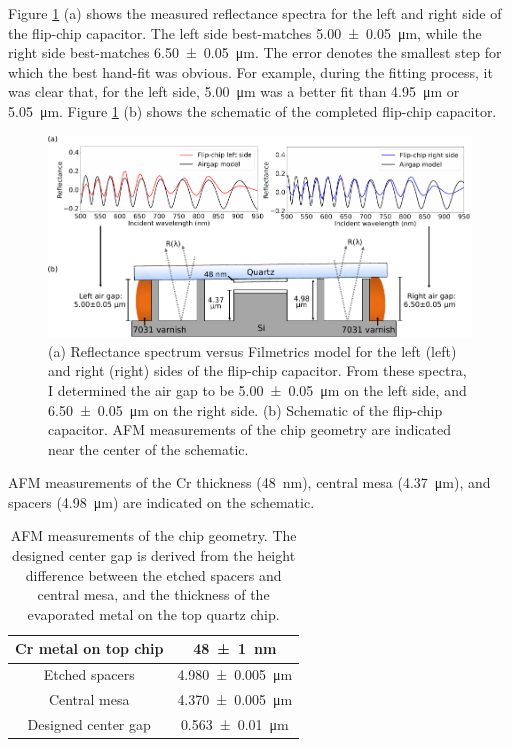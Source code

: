 \documentclass{beavtex_dub_edit}
\begin{document}
Figure \ref{FCCap Ref Summ} (a) shows the measured reflectance spectra for the left and right side of the flip-chip capacitor. The left side best-matches \SI{5.00(5)}{\micro\meter}, while the right side best-matches \SI{6.50(5)}{\micro\meter}. The error denotes the smallest step for which the best hand-fit was obvious. For example, during the fitting process, it was clear that, for the left side, \SI{5.00}{\micro\meter} was a better fit than \SI{4.95}{\micro\meter} or \SI{5.05}{\micro\meter}. Figure \ref{FCCap Ref Summ} (b) shows the schematic of the completed flip-chip capacitor.
\begin{figure}
    \includegraphics[width = 1\textwidth]{Flip-chip capacitor reflectance summary.pdf}
    \caption{(a) Reflectance spectrum versus Filmetrics model for the left (left) and right (right) sides of the flip-chip capacitor. From these spectra, I determined the air gap to be \SI{5.00(5)}{\micro\meter} on the left side, and \SI{6.50(5)}{\micro\meter} on the right side. (b) Schematic of the flip-chip capacitor. AFM measurements of the chip geometry are indicated near the center of the schematic.}
    \label{FCCap Ref Summ}
\end{figure}
AFM measurements of the Cr thickness (\SI{48}{\nano\meter}), central mesa (\SI{4.37}{\micro\meter}), and spacers (\SI{4.98}{\micro\meter}) are indicated on the schematic.

\begin{table}
    \centering
    \begin{tabular}{|c|c|}
        \hline
        Cr metal on top chip & \SI{48(1)}{\nano\meter} \\
        \hline
        Etched spacers & \SI{4.980(5)}{\micro\meter} \\
        \hline
        Central mesa & \SI{4.370(5)}{\micro\meter} \\
        \hline
        \hline
        Designed center gap & \SI{0.563(10)}{\micro\meter} \\
        \hline
    \end{tabular}
    \caption{AFM measurements of the chip geometry. The designed center gap is derived from the height difference between the etched spacers and central mesa, and the thickness of the evaporated metal on the top quartz chip.}
    \label{flip-chip AFM table}
\end{table}
\end{document}
